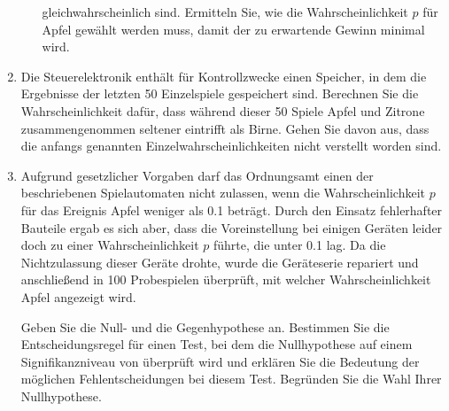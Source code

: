 \begin{exercise}
\begin{enumerate}[1)]
\begin{enumerate}[a)]
                    gleichwahrscheinlich sind. Ermitteln Sie, wie
                    die Wahrscheinlichkeit $p$ für \glqq Apfel\grqq{}
                    gewählt werden muss, damit der zu erwartende
                    Gewinn minimal wird.
            \end{enumerate}
      \item Die Steuerelektronik enthält für Kontrollzwecke einen
            Speicher, in dem die Ergebnisse der letzten 50 Einzelspiele
            gespeichert sind. Berechnen Sie die Wahrscheinlichkeit dafür,
            dass während dieser 50 Spiele \glqq Apfel\grqq{} und
            \glqq Zitrone\grqq{} zusammengenommen seltener eintrifft als
            \glqq Birne\grqq. Gehen Sie davon aus, dass die anfangs
            genannten Einzelwahrscheinlichkeiten nicht verstellt worden sind.
      \item Aufgrund gesetzlicher Vorgaben darf das Ordnungsamt einen der
            beschriebenen Spielautomaten nicht zulassen, wenn die
            Wahrscheinlichkeit $p$ für das Ereignis \glqq Apfel\grqq{}
            weniger als \num{0.1} beträgt. Durch den Einsatz
            fehlerhafter Bauteile ergab es sich aber, dass die
            Voreinstellung bei einigen Geräten leider doch zu einer
            Wahrscheinlichkeit $p$ führte, die unter \num{0.1} lag.
            Da die Nichtzulassung dieser Geräte drohte, wurde die
            Geräteserie repariert und anschließend in 100 Probespielen
            überprüft, mit welcher Wahrscheinlichkeit \glqq Apfel\grqq{}
            angezeigt wird.\par
            Geben Sie die Null- und die Gegenhypothese an. Bestimmen Sie
            die Entscheidungsregel für einen Test, bei dem die Nullhypothese
            auf einem Signifikanzniveau von  überprüft wird und
            erklären Sie die Bedeutung der möglichen Fehlentscheidungen
            bei diesem Test. Begründen Sie die Wahl Ihrer Nullhypothese.
    \end{enumerate}
  \fi
\end{exercise}
